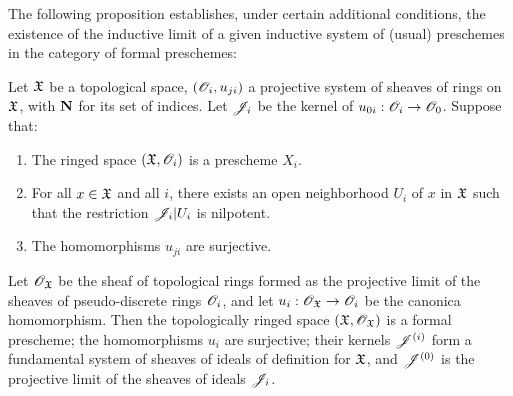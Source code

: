 The following proposition establishes, under certain additional conditions, the existence of the inductive limit of a given inductive system of (usual) preschemes in the category of formal preschemes:
\begin{prop}[10.6.3]
\label{1.10.6.3}
Let $\mathfrak{X}$ be a topological space, $(\mathscr{O}_i,u_{ji})$ a projective system of sheaves of rings on $\mathfrak{X}$, with $\mathbf{N}$ for its set of indices.
Let $\mathscr{J}_i$ be the kernel of $u_{0i}:\OO_i\to\OO_0$.
Suppose that:
\begin{enumerate}[label=\emph{(\alph*)}]
  \item The ringed space $(\mathfrak{X},\mathscr{O}_i)$ is a prescheme $X_i$.
  \item For all $x\in\mathfrak{X}$ and all $i$, there exists an open neighborhood $U_i$ of $x$ in $\mathfrak{X}$ such that the restriction $\mathscr{J}_i|U_i$ is nilpotent.
  \item The homomorphisms $u_{ji}$ are surjective.
\end{enumerate}

Let $\mathscr{O}_\mathfrak{X}$ be the sheaf of topological rings formed as the projective limit of the sheaves of pseudo-discrete rings $\mathscr{O}_i$, and let $u_i:\OO_\fk{X}\to\OO_i$ be the canonica homomorphism.
Then the topologically ringed space $(\mathfrak{X},\mathscr{O}_\mathfrak{X})$ is a formal prescheme; the homomorphisms $u_i$ are surjective; their kernels $\mathscr{J}^{(i)}$ form a fundamental system of sheaves of ideals of definition for $\mathfrak{X}$, and $\mathscr{J}^{(0)}$ is the projective limit of the sheaves of ideals $\mathscr{J}_i$.
\end{prop}

